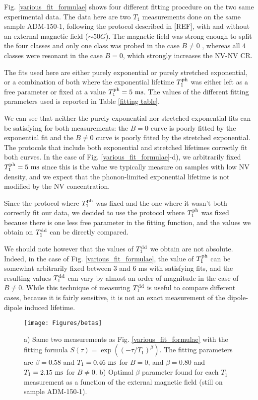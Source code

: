 \documentclass[a4paper,11pt]{report}
\begin{document}
Fig. \ref{various_fit_formulae} shows four different fitting procedure on the two same experimental data. The data here are two $T_1$ measurements done on the same sample ADM-150-1, following the protocol described in [REF], with and without an external magnetic field ($\sim 50 G$). The magnetic field was strong enough to split the four classes and only one class was probed in the case $B\neq0$ , whereas all 4 classes were resonant in the case $B=0$, which strongly increases the NV-NV CR. 

The fits used here are either purely exponential or purely stretched exponential, or a combination of both where the exponential lifetime $T_1^{\rm ph}$ was either left as a free parameter or fixed at a value $T_1^{\rm ph}=5\ \rm ms$. The values of the different fitting parameters used is reported in Table \ref{fitting table}.

We can see that neither the purely exponential nor stretched exponential fits can be satisfying for both measurements: the $B=0$ curve is poorly fitted by the exponential fit and the $B \neq 0$ curve is poorly fitted by the stretched exponential. The protocols that include both exponential and stretched lifetimes correctly fit both curves. In the case of Fig. \ref{various_fit_formulae}-d), we arbitrarily fixed $T_1^{\rm ph}=5\ \rm ms$ since this is the value we typically measure on samples with low NV density, and we expect that the phonon-limited exponential lifetime is not modified by the NV concentration.

Since the protocol where $T_1^{\rm ph}$ was fixed and the one where it wasn't both correctly fit our data, we decided to use the protocol where $T_1^{\rm ph}$ was fixed because there is one less free parameter in the fitting function, and the values we obtain on $T_1^{\rm dd}$ can be directly compared. 

We should note however that the values of $T_1^{\rm dd}$ we obtain are not absolute. Indeed, in the case of Fig. \ref{various_fit_formulae}, the value of $T_1^{\rm ph}$ can be somewhat arbitrarily fixed between 3 and 6 ms with satisfying fits, and the resulting values $T_1^{\rm dd}$ can vary by almost an order of magnitude in the case of $B\neq0$. While this technique of measuring $T_1^{\rm dd}$ is useful to compare different cases, because it is fairly sensitive, it is not an exact measurement of the dipole-dipole induced lifetime.

\begin{figure}[h]
\centering
\texttt{[image: Figures/betas]}
\caption{a) Same two measurements as Fig. \ref{various_fit_formulae} with the fitting formula $S(\tau)=\exp ((-\tau/T_1)^{\beta})$. The fitting parameters are $\beta=0.58$ and $T_1=0.46\ \rm ms$ for $B=0$, and $\beta=0.80$ and $T_1=2.15\ \rm ms$ for $B\neq0$. b) Optimal $\beta$ parameter found for each $T_1$ measurement as a function of the external magnetic field (still on sample ADM-150-1).}
\label{betas}
\end{figure}
\end{document}
